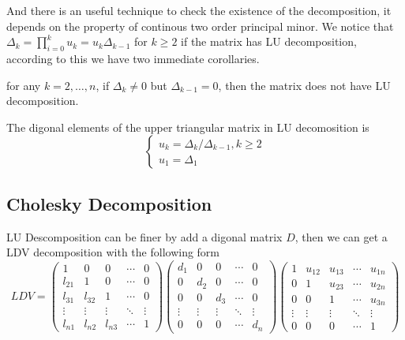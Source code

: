 \documentclass[en,hazy,black,pc,12pt]{elegantnote}
\begin{document}
And there is an useful technique to check the existence of the decomposition, it depends on the property of continous two order principal minor.  We notice that \(\Delta_k = \prod_{i=0}^k u_k = u_k \Delta_{k-1}\) for \(k \geq 2\) if the matrix has LU decomposition, according to this we have two immediate corollaries.

\begin{corollary}
    for any \(k= 2, \ldots ,n\), if \(\Delta_k \neq 0\) but \(\Delta_{k-1} =0\), then the matrix does not have LU decomposition.
\end{corollary}

\begin{corollary}
    The digonal elements of the upper triangular matrix in LU decomosition is 
    \[ \begin{cases}
        u_k = \Delta_k / \Delta_{k-1} , k \geq 2\\
        u_1 = \Delta_1 
    \end{cases}\]
\end{corollary}



\subsection{Cholesky Decomposition}

LU Descomposition can be finer by add a digonal matrix \(D\), then we can get a LDV decomposition with the following form
\[
LDV=\begin{pmatrix}
    1 & 0      & 0      & \cdots & 0 \\
    l_{21} & 1 & 0      & \cdots & 0 \\
    l_{31} & l_{32} & 1 & \cdots & 0 \\
    \vdots & \vdots & \vdots & \ddots & \vdots \\
    l_{n1} & l_{n2} & l_{n3} & \cdots & 1
\end{pmatrix}
\begin{pmatrix}
    d_1 & 0   & 0   & \cdots & 0 \\
    0   & d_2 & 0   & \cdots & 0 \\
    0   & 0   & d_3 & \cdots & 0 \\
    \vdots & \vdots & \vdots & \ddots & \vdots \\
    0   & 0   & 0   & \cdots & d_n
\end{pmatrix}
\begin{pmatrix}
    1 & u_{12} & u_{13} & \cdots & u_{1n} \\
    0 & 1      & u_{23} & \cdots & u_{2n} \\
    0 & 0      & 1      & \cdots & u_{3n} \\
    \vdots & \vdots & \vdots & \ddots & \vdots \\
    0 & 0      & 0      & \cdots & 1
\end{pmatrix}
\]
\end{document}
